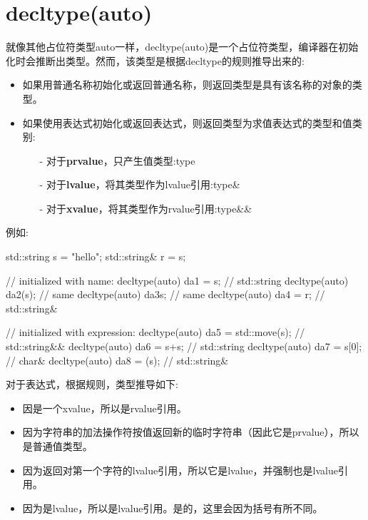 \section{decltype(auto)}
就像其他占位符类型auto一样，decltype(auto)是一个占位符类型，编译器在初始化时会推断出类型。然而，该类型是根据decltype的规则推导出来的:

\begin{itemize}
	\item 如果用普通名称初始化或返回普通名称，则返回类型是具有该名称的对象的类型。
	\item 如果使用表达式初始化或返回表达式，则返回类型为求值表达式的类型和值类别:
	\begin{itemize}
		\item[-] 对于\textbf{prvalue}，只产生值类型:type
		\item[-] 对于\textbf{lvalue}，将其类型作为lvalue引用:type\&
		\item[-] 对于\textbf{xvalue}，将其类型作为rvalue引用:type\&\&
	\end{itemize}
\end{itemize}

例如:

\begin{cppcode}
std::string s = "hello";
std::string& r = s;

// initialized with name:
decltype(auto) da1 = s; // std::string
decltype(auto) da2(s); // same
decltype(auto) da3{s}; // same
decltype(auto) da4 = r; // std::string&

// initialized with expression:
decltype(auto) da5 = std::move(s); // std::string&&
decltype(auto) da6 = s+s; // std::string
decltype(auto) da7 = s[0]; // char&
decltype(auto) da8 = (s); // std::string&
\end{cppcode}

对于表达式，根据规则，类型推导如下:

\begin{itemize}
	\item 因是一个xvalue，所以是rvalue引用。
	\item 因为字符串的加法操作符按值返回新的临时字符串（因此它是prvalue），所以是普通值类型。
	\item 因为返回对第一个字符的lvalue引用，所以它是lvalue，并强制也是lvalue引用。
	\item 因为是lvalue，所以是lvalue引用。是的，这里会因为括号有所不同。
\end{itemize}

